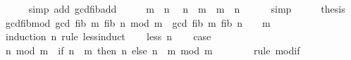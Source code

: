 \begin{isabellebody}
\ \ \ \ \isamarkupfalse%
\ {\isacharparenleft}{\kern0pt}simp\ add{\isacharcolon}{\kern0pt}\ gcd{\isacharunderscore}{\kern0pt}fib{\isacharunderscore}{\kern0pt}add{\isacharparenright}{\kern0pt}\isanewline
\ \ \isamarkupfalse%
\ \isamarkupfalse%
\ {\isacartoucheopen}m\ {\isasymle}\ n{\isacartoucheclose}\ \isamarkupfalse%
\ {\isachardoublequoteopen}n\ {\isacharminus}{\kern0pt}\ m\ {\isacharplus}{\kern0pt}\ m\ {\isacharequal}{\kern0pt}\ n{\isachardoublequoteclose}\isanewline
\ \ \ \ \isamarkupfalse%
\ simp\isanewline
\ \ \isamarkupfalse%
\ \isamarkupfalse%
\ {\isacharquery}{\kern0pt}thesis\ \isakeywordONE{{\isachardot}{\kern0pt}}\isamarkupfalse%
\isanewline
{}\isamarkupfalse%
%
\endisatagproof
{\isafoldproof}%
%
\isadelimproof
\isanewline
%
\endisadelimproof
\isanewline
{}\isamarkupfalse%
\ gcd{\isacharunderscore}{\kern0pt}fib{\isacharunderscore}{\kern0pt}mod{\isacharcolon}{\kern0pt}\ {\isachardoublequoteopen}gcd\ {\isacharparenleft}{\kern0pt}fib\ m{\isacharparenright}{\kern0pt}\ {\isacharparenleft}{\kern0pt}fib\ {\isacharparenleft}{\kern0pt}n\ mod\ m{\isacharparenright}{\kern0pt}{\isacharparenright}{\kern0pt}\ {\isacharequal}{\kern0pt}\ gcd\ {\isacharparenleft}{\kern0pt}fib\ m{\isacharparenright}{\kern0pt}\ {\isacharparenleft}{\kern0pt}fib\ n{\isacharparenright}{\kern0pt}{\isachardoublequoteclose}\ \ {\isachardoublequoteopen}{}\ {\isacharless}{\kern0pt}\ m{\isachardoublequoteclose}\isanewline
%
\isadelimproof
%
\endisadelimproof
%
\isatagproof
{}\isamarkupfalse%
\ {\isacharparenleft}{\kern0pt}induction\ n\ rule{\isacharcolon}{\kern0pt}\ less{\isacharunderscore}{\kern0pt}induct{\isacharparenright}{\kern0pt}\isanewline
\ \ \isamarkupfalse%
\ {\isacharparenleft}{\kern0pt}less\ n{\isacharparenright}{\kern0pt}\isanewline
\ \ \isamarkupfalse%
\ {\isacharquery}{\kern0pt}case\isanewline
\ \ \isamarkupfalse%
\ {\isacharminus}{\kern0pt}\isanewline
\ \ \ \ \isamarkupfalse%
\ {\isachardoublequoteopen}n\ mod\ m\ {\isacharequal}{\kern0pt}\ {\isacharparenleft}{\kern0pt}if\ n\ {\isacharless}{\kern0pt}\ m\ then\ n\ else\ {\isacharparenleft}{\kern0pt}n\ {\isacharminus}{\kern0pt}\ m{\isacharparenright}{\kern0pt}\ mod\ m{\isacharparenright}{\kern0pt}{\isachardoublequoteclose}\isanewline
\ \ \ \ \ \ \isamarkupfalse%
\ {\isacharparenleft}{\kern0pt}rule\ mod{\isacharunderscore}{\kern0pt}if{\isacharparenright}{\kern0pt}\isanewline

\end{isabellebody}
